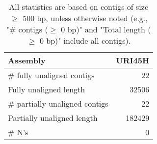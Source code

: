 \documentclass[12pt,a4paper]{article}
\begin{document}
\begin{table}[ht]
\begin{center}
\caption{All statistics are based on contigs of size $\geq$ 500 bp, unless otherwise noted (e.g., "\# contigs ($\geq$ 0 bp)" and "Total length ($\geq$ 0 bp)" include all contigs).}
\begin{tabular}{|l*{1}{|r}|}
\hline
Assembly & URI45H \\ \hline
\# fully unaligned contigs & 22 \\ \hline
Fully unaligned length & 32506 \\ \hline
\# partially unaligned contigs & 22 \\ \hline
Partially unaligned length & 182429 \\ \hline
\# N's & 0 \\ \hline
\end{tabular}
\end{center}
\end{table}
\end{document}
